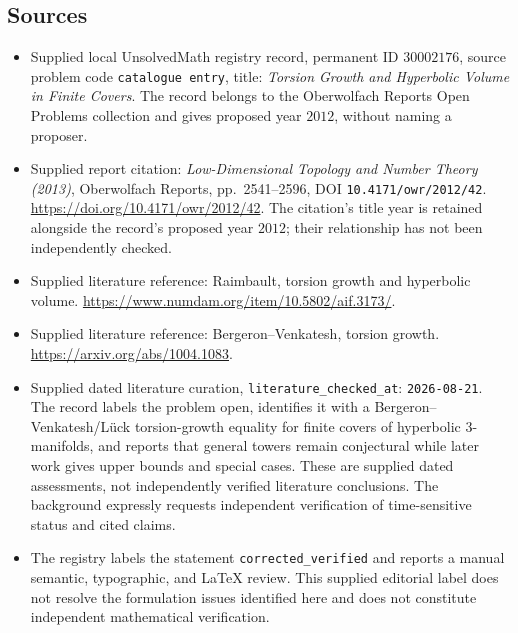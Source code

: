 \documentclass[11pt]{article}
\begin{document}
\subsection{Sources}
\begin{itemize}
\item Supplied local UnsolvedMath registry record, permanent ID \(30002176\), source problem code \texttt{catalogue entry}, title: \emph{Torsion Growth and Hyperbolic Volume in Finite Covers}. The record belongs to the Oberwolfach Reports Open Problems collection and gives proposed year \(2012\), without naming a proposer.
\item Supplied report citation: \emph{Low-Dimensional Topology and Number Theory (2013)}, Oberwolfach Reports, pp.\ 2541--2596, DOI \texttt{10.4171/owr/2012/42}. \url{https://doi.org/10.4171/owr/2012/42}. The citation's title year is retained alongside the record's proposed year \(2012\); their relationship has not been independently checked.
\item Supplied literature reference: Raimbault, torsion growth and hyperbolic volume. \url{https://www.numdam.org/item/10.5802/aif.3173/}.
\item Supplied literature reference: Bergeron--Venkatesh, torsion growth. \url{https://arxiv.org/abs/1004.1083}.
\item Supplied dated literature curation, \texttt{literature\_checked\_at}: \texttt{2026-08-21}. The record labels the problem open, identifies it with a Bergeron--Venkatesh/L\"uck torsion-growth equality for finite covers of hyperbolic \(3\)-manifolds, and reports that general towers remain conjectural while later work gives upper bounds and special cases. These are supplied dated assessments, not independently verified literature conclusions. The background expressly requests independent verification of time-sensitive status and cited claims.
\item The registry labels the statement \texttt{corrected\_verified} and reports a manual semantic, typographic, and LaTeX review. This supplied editorial label does not resolve the formulation issues identified here and does not constitute independent mathematical verification.
\end{itemize}
\end{document}
